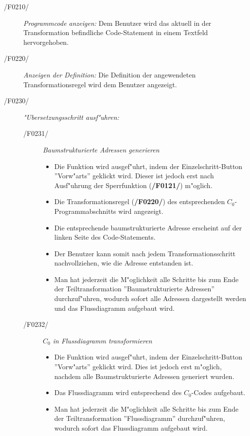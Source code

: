   \begin{description}
    \item[/F0210/]
      \textit{Programmcode anzeigen:} Dem Benutzer wird das aktuell in der
      Transformation befindliche Code-Statement in einem Textfeld hervorgehoben.
    \item[/F0220/]
      \textit{Anzeigen der Definition:} Die Definition der angewendeten
      Transformationsregel wird dem Benutzer angezeigt.
    \item[/F0230/]
      \textit{"Ubersetzungsschritt ausf"uhren:}
      \begin{description}
        \item[/F0231/]
        \textit{Baumstrukturierte Adressen generieren}
        \begin{itemize}
          \item Die Funktion wird ausgef"uhrt, indem der Einzelschritt-Button
          ''Vorw"arts'' geklickt wird. Dieser ist jedoch erst nach
          Ausf"uhrung der Sperrfunktion (\textbf{/F0121/}) m"oglich.
          \item Die Transformationsregel (\textbf{/F0220/}) des entsprechenden
          $C_0$-Programmabschnitts wird angezeigt.
          \item Die entsprechende baumstrukturierte Adresse erscheint auf der
          linken Seite des Code-Statements.
          \item Der Benutzer kann somit nach jedem Transformationsschritt
          nachvollziehen, wie die Adresse entstanden ist.
          \item Man hat jederzeit die M"oglichkeit alle Schritte bis zum Ende
          der Teiltransformation ''Baumstrukturierte Adressen'' durchzuf"uhren,
          wodurch sofort alle Adressen dargestellt werden und das
          Flussdiagramm aufgebaut wird.  
        \end{itemize}

        \item[/F0232/]
        \textit{$C_0$ in Flussdiagramm transformieren}
        \begin{itemize}
          \item Die Funktion wird ausgef"uhrt, indem der Einzelschritt-Button
          ''Vorw"arts'' geklickt wird. Dies ist jedoch erst m"oglich, nachdem alle Baumstrukturierte Adressen generiert wurden.
          \item Das Flussdiagramm wird entsprechend des $C_0$-Codes aufgebaut.
          \item Man hat jederzeit die M"oglichkeit alle Schritte bis zum Ende
          der Teiltransformation ''Flussdiagramm'' durchzuf"uhren, wodurch sofort
          das Flussdiagramm aufgebaut wird.  
        \end{itemize}


\end{description}
\end{description}
